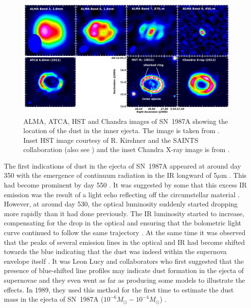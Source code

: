 \begin{figure}
\centering
\includegraphics[clip=true,scale=0.31,trim= 0 0 0 0]{chapters/chapter5/images/ALMA_imgs.png}
\caption{ALMA, ATCA, HST and Chandra images of SN~1987A showing the location of the dust in the inner ejecta.  The image is taken from \citep{Indebetouw2014}.  Inset HST image courtesy of R. Kirshner and the SAINTS collaboration (also see \citet{Larsson2013}) and the inset Chandra X-ray image is from \citet{Helder2013}.}
\label{ALMA}
\end{figure}

The first indications of dust in the ejecta of SN~1987A appeared at around day 350 with the emergence of continuum radiation in the IR longward of 5$\mu$m \citep{Meikle1993}.  This had become prominent by day 550 \citep{Roche1993,Wooden1993}.  It was suggested by some that this excess IR emission was the result of  a light echo reflecting off the circumstellar material \citep{Roche1989}.  However, at around day 530, the optical luminosity suddenly started dropping more rapidly than it had done previously.  The IR luminosity started to increase,  compensating for the drop in the optical and ensuring that the bolometric light curve continued to follow the same trajectory \citep{Suntzeff1991,Whitelock1991}.  At the same time it was observed that the peaks of several emission lines in the optical and IR had become shifted towards the blue indicating that the dust was indeed within the supernova envelope itself \citep{Danziger1991a,Danziger1991,Meikle1991,Meikle1993,Suntzeff1991,Hanuschik1993}.  It was Leon Lucy and collaborators who first suggested that the presence of blue-shifted line profiles may indicate dust formation in the ejecta of supernovae and they even went as far as producing some models to illustrate the effects.  In 1989, they used this method for the first time to estimate the dust mass in the ejecta of SN~1987A ($10^{-6}M_{\odot} - 10^{-4}M_{\odot}$)  \citep{Lucy1989,Lucy1991}.  

